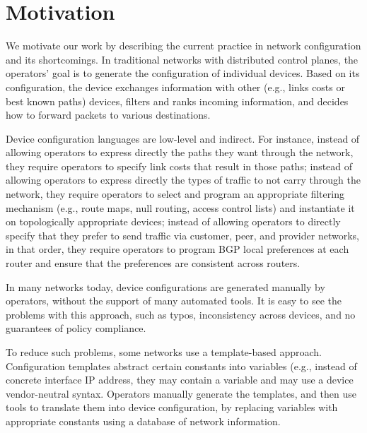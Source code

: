 \section{Motivation}
\label{sec:motivation}

We motivate our work by describing the current practice in network configuration and its shortcomings.
In traditional networks with distributed control planes, the operators’ goal is to generate the configuration of individual devices. Based on its configuration, the device exchanges information with other (e.g., links costs or best known paths) devices, filters and ranks incoming information, and decides how to forward packets to various destinations.

Device configuration languages are low-level and indirect. For instance, instead of allowing operators to express directly the paths they want through the network, they require operators to specify link costs that result in those paths; instead of allowing operators to express directly the types of traffic to not carry through the network, they require operators to select and program an appropriate filtering mechanism (e.g., route maps, null routing,  access control lists) and instantiate it on topologically appropriate devices; instead of allowing operators to directly specify that they prefer to send traffic via customer, peer, and provider networks, in that order, they require operators to program BGP local preferences at each router and ensure that the preferences are consistent across routers.

In many networks today, device configurations are generated manually by operators, without the support of many automated tools. It is easy to see the problems with this approach, such as typos, inconsistency across devices, and no guarantees of policy compliance.

To reduce such problems, some networks use a template-based approach. Configuration templates abstract certain constants into variables (e.g., instead of concrete interface IP address, they may contain a variable {\small {}} and may use a device vendor-neutral syntax. Operators manually generate the templates, and then use tools to translate them into device configuration, by replacing variables with appropriate constants using a database of network information.
 


